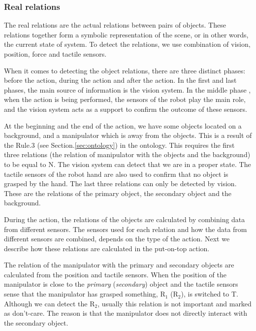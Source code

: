 \subsubsection{Real relations}
\label{sec:real_relations}
The real relations are the actual relations between pairs of objects.
These relations together form a symbolic representation of the scene, or in other words, the current state of system.
To detect the relations, we use combination of vision, position, force and tactile sensors.

When it comes to detecting the object relations, there are three distinct phases: before the action, during the action and after the action.
In the first and last phases, the main source of information is the vision system.
In the middle phase , when the action is being performed, the sensors of the robot play the main role,
and the vision system acts as a support to confirm the outcome of these sensors.

At the beginning and the end of the action, we have some objects located on a background, and a manipulator which is away from the objects.
This is a result of the Rule.3 (see Section.\ref{sec:ontology}) in the ontology.
This requires the first three relations (the relation of manipulator with the objects and the background) to be equal to N.
The vision system can detect that we are in a proper state.
The tactile sensors of the robot hand are also used to confirm that no object is grasped by the hand.
The last three relations can only be detected by vision.
These are the relations of the primary object, the secondary object and the background.

During the action, the relations of the objects are calculated by combining data from different sensors.
The sensors used for each relation and how the data from different sensors are combined, depends on the type of the action.
Next we describe how these relations are calculated in the put-on-top action.

The relation of the manipulator with the primary and secondary objects are calculated from the position and tactile sensors.
When the position of the manipulator is close to the \textit{primary} (\textit{secondary}) object and the tactile sensors sense that the manipulator has grasped something,
$\text{R}_1$ ($\text{R}_2$), is switched to T.
Although we can detect the $\text{R}_2$, usually this relation is not important and marked as don't-care.
The reason is that the manipulator does not directly interact with the secondary object.

